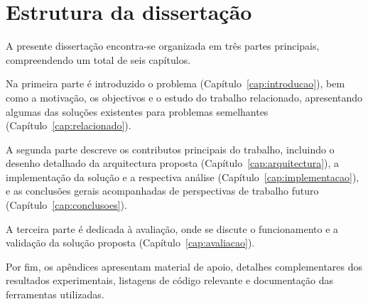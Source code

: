 \section{Estrutura da dissertação}

A presente dissertação encontra-se organizada em três partes principais, compreendendo um total de seis capítulos.

Na primeira parte é introduzido o problema (Capítulo~\ref{cap:introducao}), bem como a motivação, os objectivos e o estudo do trabalho relacionado, apresentando algumas das soluções existentes para problemas semelhantes (Capítulo~\ref{cap:relacionado}).

A segunda parte descreve os contributos principais do trabalho, incluindo o desenho detalhado da arquitectura proposta (Capítulo~\ref{cap:arquitectura}), a implementação da solução e a respectiva análise (Capítulo~\ref{cap:implementacao}), e as conclusões gerais acompanhadas de perspectivas de trabalho futuro (Capítulo~\ref{cap:conclusoes}).

A terceira parte é dedicada à avaliação, onde se discute o funcionamento e a validação da solução proposta (Capítulo~\ref{cap:avaliacao}).

Por fim, os apêndices apresentam material de apoio, detalhes complementares dos resultados experimentais, listagens de código relevante e documentação das ferramentas utilizadas.
